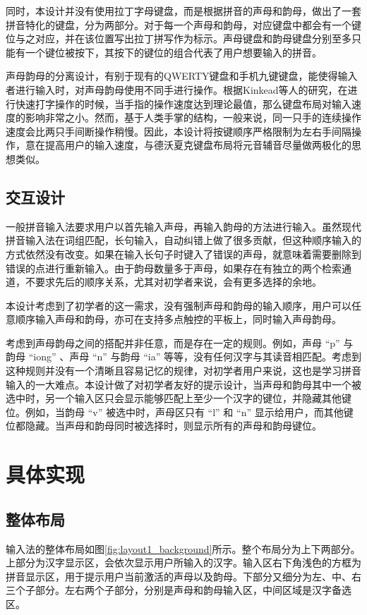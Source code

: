   同时，本设计并没有使用拉丁字母键盘，而是根据拼音的声母和韵母，做出了一套拼音特化的键盘，分为两部分。对于每一个声母和韵母，对应键盘中都会有一个键位与之对应，并在该位置写出拉丁拼写作为标示。声母键盘和韵母键盘分别至多只能有一个键位被按下，其按下的键位的组合代表了用户想要输入的拼音。

  声母韵母的分离设计，有别于现有的QWERTY键盘和手机九键键盘，能使得输入者进行输入时，对声母韵母使用不同手进行操作。根据Kinkead等人的研究\supercite{kinkead}，在进行快速打字操作的时候，当手指的操作速度达到理论最值，那么键盘布局对输入速度的影响非常之小。然而，基于人类手掌的结构，一般来说，同一只手的连续操作速度会比两只手间断操作稍慢。因此，本设计将按键顺序严格限制为左右手间隔操作，意在提高用户的输入速度，与德沃夏克键盘布局将元音辅音尽量做两极化的思想类似。

  \subsection{交互设计}

  一般拼音输入法要求用户以首先输入声母，再输入韵母的方法进行输入。虽然现代拼音输入法在词组匹配，长句输入，自动纠错上做了很多贡献，但这种顺序输入的方式依然没有改变。如果在输入长句子时键入了错误的声母，就意味着需要删除到错误的点进行重新输入。由于韵母数量多于声母，如果存在有独立的两个检索通道，不要求先后的顺序关系，尤其对初学者来说，会有更多选择的余地。

  本设计考虑到了初学者的这一需求，没有强制声母和韵母的输入顺序，用户可以任意顺序输入声母和韵母，亦可在支持多点触控的平板上，同时输入声母韵母。

  考虑到声母韵母之间的搭配并非任意，而是存在一定的规则。例如，声母 “p” 与韵母 “iong” 、声母 “n” 与韵母 “ia” 等等，没有任何汉字与其读音相匹配。考虑到这种规则并没有一个清晰且容易记忆的规律，对初学者用户来说，这也是学习拼音输入的一大难点。本设计做了对初学者友好的提示设计，当声母和韵母其中一个被选中时，另一个输入区只会显示能够匹配上至少一个汉字的键位，并隐藏其他键位。例如，当韵母 “v” 被选中时，声母区只有 “l” 和 “n” 显示给用户，而其他键位都隐藏。当声母和韵母同时被选择时，则显示所有的声母和韵母键位。

  \section{具体实现}
  \subsection{整体布局}

  输入法的整体布局如图\ref{fig:layout1_background}所示。整个布局分为上下两部分。上部分为汉字显示区，会依次显示用户所输入的汉字。输入区右下角浅色的方框为拼音显示区，用于提示用户当前激活的声母以及韵母。下部分又细分为左、中、右三个子部分。左右两个子部分，分别是声母和韵母输入区，中间区域是汉字备选区。


